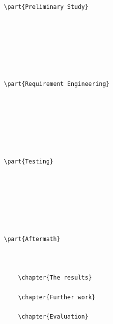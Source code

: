 \documentclass[12pt]{report}
\begin{document}
\begin{verbatim}

	
	
	
	
	
	
		
		
	
	
	
	
\part{Preliminary Study}

	
	
	
	
	
	
\part{Requirement Engineering}

	

	
	
	
	
\part{Testing}

	

	
	
	
	
\part{Aftermath}

	
		
	\chapter{The results}
		
	\chapter{Further work}
	
	\chapter{Evaluation}
	

\end{verbatim}
\end{document}
